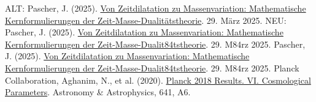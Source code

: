 \documentclass[a4paper,12pt]{article}
\begin{document}
\begin{thebibliography}{99}
    ALT: 		 Pascher, J. (2025). \href{https://github.com/jpascher/T0-Time-Mass-Duality/tree/main/2/pdf/Deutsch/Mathematische\%20Formulierungen\%20der\%20Zeit-Masse-Dualit\%C3\%A4tstheorie\%20mit\%20Lagrange.pdf}{Von Zeitdilatation zu Massenvariation: Mathematische Kernformulierungen der Zeit-Masse-Dualitätstheorie}. 29. März 2025.
    NEU: 		 Pascher, J. (2025). \href{https://github.com/jpascher/T0-Time-Mass-Duality/tree/main/2/pdf/Deutsch/Mathematische\%20Formulierungen\%20der\%20Zeit-Masse-Dualit\%C3\%A4tstheorie\%20mit\%20Lagrange.pdf}{Von Zeitdilatation zu Massenvariation: Mathematische Kernformulierungen der Zeit-Masse-Dualit84tstheorie}. 29. M84rz 2025.
		 Pascher, J. (2025). \href{https://github.com/jpascher/T0-Time-Mass-Duality/tree/main/2/pdf/Deutsch/Mathematische\%20Formulierungen\%20der\%20Zeit-Masse-Dualit\%C3\%A4tstheorie\%20mit\%20Lagrange.pdf}{Von Zeitdilatation zu Massenvariation: Mathematische Kernformulierungen der Zeit-Masse-Dualit84tstheorie}. 29. M84rz 2025.
		 Planck Collaboration, Aghanim, N., et al. (2020). \href{https://doi.org/10.1051/0004-6361/201833910}{Planck 2018 Results. VI. Cosmological Parameters}. Astronomy \& Astrophysics, 641, A6.
	\end{thebibliography}
	
\end{document}
